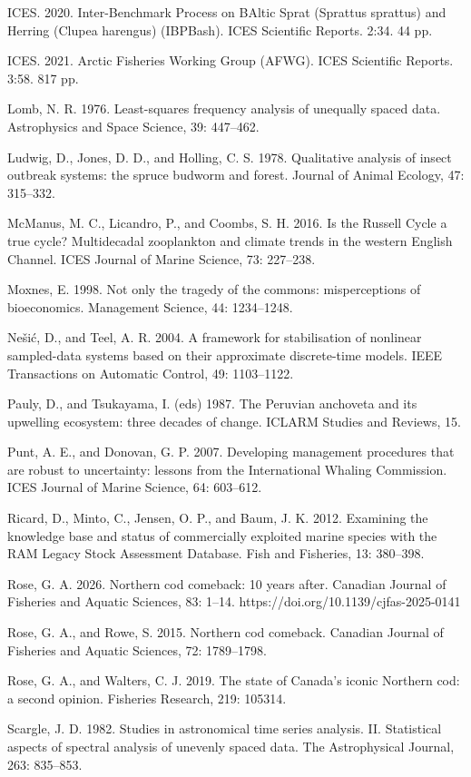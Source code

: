 \documentclass[11pt]{article}
\begin{document}
ICES. 2020. Inter-Benchmark Process on BAltic Sprat (Sprattus sprattus)
and Herring (Clupea harengus) (IBPBash). ICES Scientific Reports. 2:34.
44 pp.

ICES. 2021. Arctic Fisheries Working Group (AFWG). ICES Scientific
Reports. 3:58. 817 pp.

Lomb, N. R. 1976. Least-squares frequency analysis of unequally spaced
data. Astrophysics and Space Science, 39: 447--462.

Ludwig, D., Jones, D. D., and Holling, C. S. 1978. Qualitative analysis
of insect outbreak systems: the spruce budworm and forest. Journal of
Animal Ecology, 47: 315--332.

McManus, M. C., Licandro, P., and Coombs, S. H. 2016. Is the Russell
Cycle a true cycle? Multidecadal zooplankton and climate trends in the
western English Channel. ICES Journal of Marine Science, 73: 227--238.

Moxnes, E. 1998. Not only the tragedy of the commons: misperceptions of
bioeconomics. Management Science, 44: 1234--1248.

Ne\v{s}i\'c, D., and Teel, A. R. 2004. A framework for stabilisation of
nonlinear sampled-data systems based on their approximate discrete-time
models. IEEE Transactions on Automatic Control, 49: 1103--1122.

Pauly, D., and Tsukayama, I. (eds) 1987. The Peruvian anchoveta and its
upwelling ecosystem: three decades of change. ICLARM Studies and
Reviews, 15.

Punt, A. E., and Donovan, G. P. 2007. Developing management procedures
that are robust to uncertainty: lessons from the International Whaling
Commission. ICES Journal of Marine Science, 64: 603--612.

Ricard, D., Minto, C., Jensen, O. P., and Baum, J. K. 2012. Examining
the knowledge base and status of commercially exploited marine species
with the RAM Legacy Stock Assessment Database. Fish and Fisheries, 13:
380--398.

Rose, G. A. 2026. Northern cod comeback: 10 years after. Canadian
Journal of Fisheries and Aquatic Sciences, 83: 1--14.
https://doi.org/10.1139/cjfas-2025-0141

Rose, G. A., and Rowe, S. 2015. Northern cod comeback. Canadian Journal
of Fisheries and Aquatic Sciences, 72: 1789--1798.

Rose, G. A., and Walters, C. J. 2019. The state of Canada's iconic
Northern cod: a second opinion. Fisheries Research, 219: 105314.

Scargle, J. D. 1982. Studies in astronomical time series analysis. II.
Statistical aspects of spectral analysis of unevenly spaced data. The
Astrophysical Journal, 263: 835--853.
\end{document}
